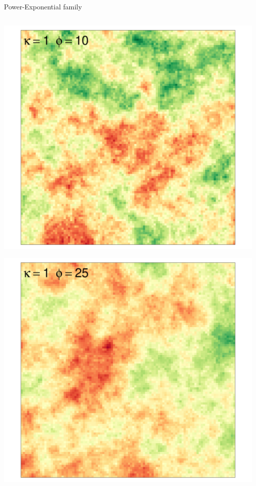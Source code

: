 \documentclass[
  ignorenonframetext,
]{beamer}
\begin{document}
\begin{frame}{Power-Exponential family}
\begin{columns}[T]
\begin{column}{0.33\textwidth}
\includegraphics{Lecture_1_files/figure-beamer/unnamed-chunk-14-1.pdf}

\includegraphics{Lecture_1_files/figure-beamer/unnamed-chunk-15-1.pdf}
\end{column}


\end{columns}
\end{frame}
\end{document}
